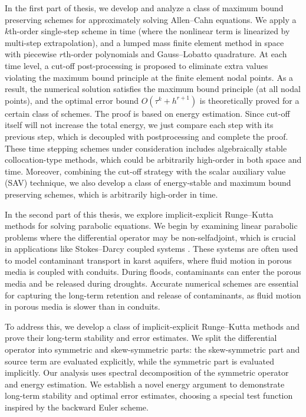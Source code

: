 \documentclass[a4paper, oneside]{book}
\begin{document}
In the first part of thesis, we develop and analyze a class of maximum bound preserving schemes for approximately solving Allen--Cahn equations.
We apply a $k$th-order single-step scheme in time (where the nonlinear term is linearized by multi-step extrapolation),
and  a lumped mass finite element method in space with piecewise
$r$th-order polynomials and Gauss--Lobatto quadrature. At each time level, a cut-off post-processing
is proposed to eliminate extra values violating the maximum bound principle at the finite element nodal points.
As a result, the numerical solution satisfies the maximum bound principle (at all nodal points),
and the optimal error bound $O(\tau^k+h^{r+1})$ is theoretically proved for a certain class of schemes. The proof is based on energy estimation. Since cut-off itself will not increase the total energy, we just compare each step with its previous step, which is decoupled with postprocessing and complete the proof.
These time stepping schemes under consideration includes algebraically stable collocation-type methods,
which could be arbitrarily high-order in both space and time. 
Moreover, combining the cut-off strategy with the scalar auxiliary value (SAV) technique,
we also develop a class of energy-stable and maximum bound preserving schemes, which is arbitrarily high-order in time. 



In the second part of this thesis, we explore implicit-explicit Runge--Kutta methods for solving parabolic equations. We begin by examining linear parabolic problems where the differential operator may be non-selfadjoint, which is crucial in applications like Stokes--Darcy coupled systems \cite{HanspalWaghodeNassehiWakeman:2006,Nassehi:1998,ArbogastGomez:2009}. These systems are often used to model contaminant transport in karst aquifers, where fluid motion in porous media is coupled with conduits. During floods, contaminants can enter the porous media and be released during droughts. Accurate numerical schemes are essential for capturing the long-term retention and release of contaminants, as fluid motion in porous media is slower than in conduits.

To address this, we develop a class of implicit-explicit Runge--Kutta methods and prove their long-term stability and error estimates. We split the differential operator into symmetric and skew-symmetric parts: the skew-symmetric part and source term are evaluated explicitly, while the symmetric part is evaluated implicitly. Our analysis uses spectral decomposition of the symmetric operator and energy estimation. We establish a novel energy argument to demonstrate long-term stability and optimal error estimates, choosing a special test function inspired by the backward Euler scheme.
\end{document}
